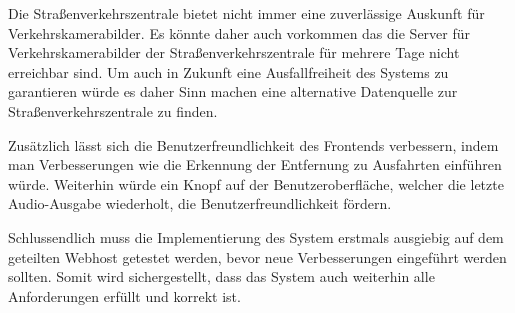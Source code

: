 Die Straßenverkehrszentrale bietet nicht immer eine zuverlässige Auskunft für Verkehrskamerabilder.
Es könnte daher auch vorkommen das die Server für Verkehrskamerabilder der Straßenverkehrszentrale für mehrere Tage nicht erreichbar sind.
Um auch in Zukunft eine Ausfallfreiheit des Systems zu garantieren würde es daher Sinn machen eine alternative Datenquelle zur Straßenverkehrszentrale zu finden.

Zusätzlich lässt sich die Benutzerfreundlichkeit des Frontends verbessern, indem man Verbesserungen wie die Erkennung der Entfernung zu Ausfahrten einführen würde.
Weiterhin würde ein Knopf auf der Benutzeroberfläche, welcher die letzte Audio-Ausgabe wiederholt, die Benutzerfreundlichkeit fördern.

Schlussendlich muss die Implementierung des System erstmals ausgiebig auf dem geteilten Webhost getestet werden, bevor neue Verbesserungen eingeführt werden sollten.
Somit wird sichergestellt, dass das System auch weiterhin alle Anforderungen erfüllt und korrekt ist.
